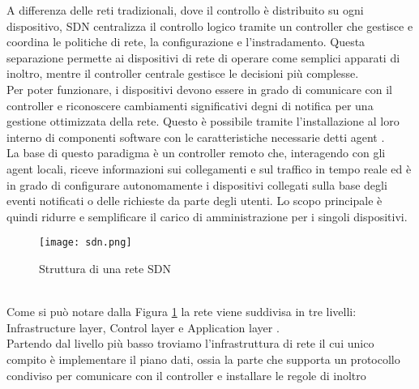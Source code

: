 A differenza delle reti tradizionali, dove il controllo è distribuito su ogni dispositivo, SDN centralizza il controllo logico tramite un controller che gestisce e coordina le politiche di rete, la configurazione e l'instradamento.
Questa separazione permette ai dispositivi di rete di operare come semplici apparati di inoltro, mentre il controller centrale gestisce le decisioni più complesse. %
\\Per poter funzionare, i dispositivi devono essere in grado di comunicare con il controller e riconoscere cambiamenti significativi degni di notifica per una gestione ottimizzata della rete. %
Questo è possibile tramite l'installazione al loro interno di componenti software con le caratteristiche necessarie
detti agent \cite{tesiSDN:2017}.
\\La base di questo paradigma è un controller remoto che, interagendo con gli agent
locali, riceve informazioni sui collegamenti e sul traffico in tempo reale ed è in grado di
configurare autonomamente i dispositivi collegati sulla base degli eventi notificati o delle richieste da parte degli utenti. Lo scopo
principale è quindi ridurre e semplificare il carico di amministrazione per i singoli dispositivi.
\begin{figure}[h]
    \centering
   \texttt{[image: sdn.png]}
    \caption{Struttura di una rete SDN \cite{fotosdn}}
    \label{fig:sdnF}
\end{figure}
\\Come si può notare dalla Figura \ref{fig:sdnF} la rete viene suddivisa in tre livelli: Infrastructure layer, Control layer e Application layer \cite{sdnlayers}.
\\Partendo dal livello più basso troviamo l'infrastruttura di rete il cui unico compito è implementare il piano dati, ossia la parte che supporta un protocollo condiviso per comunicare con il controller e installare le regole di inoltro
